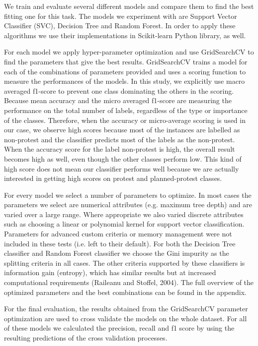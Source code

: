 \documentclass{article}
\begin{document}
We train and evaluate several different models and compare them to find the best fitting one for this task. The models we experiment with are Support Vector Classifier (SVC), Decision Tree and Random Forest. In order to apply these algorithms we use their implementations in Scikit-learn Python library, as well.

For each model we apply hyper-parameter optimization and use GridSearchCV to find the parameters that give the best results. GridSearchCV trains a model for each of the combinations of parameters provided and uses a scoring function to measure the performances of the models. In this study, we explicitly use macro averaged f1-score to prevent one class dominating the others in the scoring. Because mean accuracy and the micro averaged f1-score are measuring the performance on the total number of labels, regardless of the type or importance of the classes. Therefore, when the accuracy or micro-average scoring is used in our case, we observe high scores because most of the instances are labelled as non-protest and the classifier predicts most of the labels as the non-protest. When the accuracy score for the label non-protest is high, the overall result becomes high as well, even though the other classes perform low. This kind of high score does not mean our classifier performs well because we are actually interested in getting high scores on protest and planned-protest classes.

For every model we select a number of parameters to optimize. In most cases the parameters we select are numerical attributes (e.g. maximum tree depth) and are varied over a large range. Where appropriate we also varied discrete attributes such as choosing a linear or polynomial kernel for support vector classification. Parameters for advanced custom criteria or memory management were not included in these tests (i.e. left to their default). For both the Decision Tree classifier and Random Forest classifier we choose the Gini impurity as the splitting criteria in all cases. The other criteria supported by these classifiers is information gain (entropy), which has similar results but at increased computational requirements (Raileanu and Stoffel, 2004). The full overview of the optimized parameters and the best combinations can be found in the appendix. 

For the final evaluation, the results obtained from the GridSearchCV parameter optimization are used to cross validate the models on the whole dataset. For all of these models we calculated the precision, recall and f1 score by using the resulting predictions of the cross validation processes.
\end{document}
